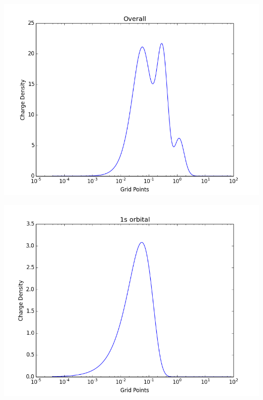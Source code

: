 \documentclass[11pt]{article}
\begin{document}
\begin{center}
\includegraphics[width=.9\linewidth]{./images/Ar-overall-charge-density.png}
\end{center}

\begin{center}
\includegraphics[width=.9\linewidth]{./images/Ar-1s-charge-density.png}
\end{center}
\end{document}
